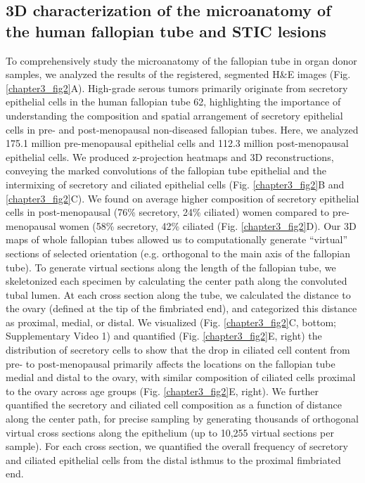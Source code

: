 \begin{refsection}
    \subsection{3D characterization of the microanatomy of the human fallopian tube and STIC lesions}
    To comprehensively study the microanatomy of the fallopian tube in organ donor samples, we analyzed the results of the registered, segmented H\&E images (Fig. \ref{chapter3_fig2}A). High-grade serous tumors primarily originate from secretory epithelial cells in the human fallopian tube\cite{Perets2013Transformation} 62, highlighting the importance of understanding the composition and spatial arrangement of secretory epithelial cells in pre- and post-menopausal non-diseased fallopian tubes. Here, we analyzed 175.1 million pre-menopausal epithelial cells and 112.3 million post-menopausal epithelial cells. We produced z-projection heatmaps and 3D reconstructions, conveying the marked convolutions of the fallopian tube epithelial and the intermixing of secretory and ciliated epithelial cells (Fig. \ref{chapter3_fig2}B and \ref{chapter3_fig2}C). We found on average higher composition of secretory epithelial cells in post-menopausal (76\% secretory, 24\% ciliated) women compared to pre-menopausal women (58\% secretory, 42\% ciliated (Fig. \ref{chapter3_fig2}D). 
    Our 3D maps of whole fallopian tubes allowed us to computationally generate “virtual” sections of selected orientation (e.g. orthogonal to the main axis of the fallopian tube). To generate virtual sections along the length of the fallopian tube, we skeletonized each specimen by calculating the center path along the convoluted tubal lumen. At each cross section along the tube, we calculated the distance to the ovary (defined at the tip of the fimbriated end), and categorized this distance as proximal, medial, or distal. We visualized (Fig. \ref{chapter3_fig2}C, bottom; Supplementary Video 1) and quantified (Fig. \ref{chapter3_fig2}E, right) the distribution of secretory cells to show that the drop in ciliated cell content from pre- to post-menopausal primarily affects the locations on the fallopian tube medial and distal to the ovary, with similar composition of ciliated cells proximal to the ovary across age groups (Fig. \ref{chapter3_fig2}E, right). We further quantified the secretory and ciliated cell composition as a function of distance along the center path, for precise sampling by generating thousands of orthogonal virtual cross sections along the epithelium (up to 10,255 virtual sections per sample). For each cross section, we quantified the overall frequency of secretory and ciliated epithelial cells from the distal isthmus to the proximal fimbriated end. 

\end{refsection}
